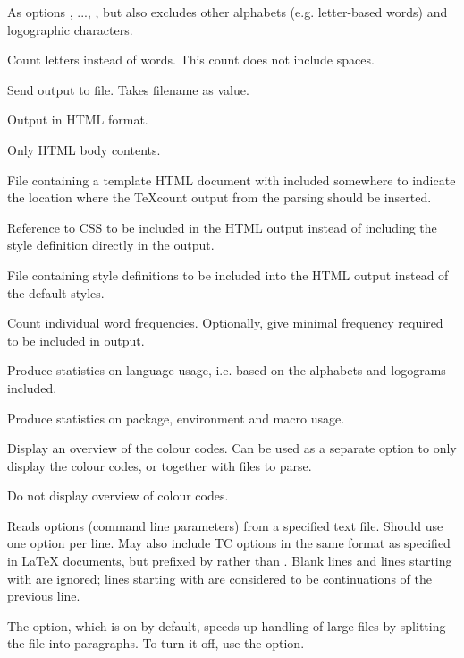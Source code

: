 \begin{description}
As options , ..., , but also excludes other alphabets (e.g. letter-based words) and logographic characters.

Count letters instead of words. This count does not include spaces.

\option[-out=]Send output to file. Takes filename as value.

\option[-html]Output in HTML format.

\option[-htmlcore]Only HTML body contents.

\option[-htmlfile=]File containing a template HTML document with  included somewhere to indicate the location where the TeXcount output from the parsing should be inserted.

\option[-css=]Reference to CSS to be included in the HTML output instead of including the style definition directly in the output.

\option[-cssfile=, -css=file:]File containing style definitions to be included into the HTML output instead of the default styles.

\option[-freq\alt{=\#}]Count individual word frequencies. Optionally, give minimal frequency required to be included in output.

\option[-stat]Produce statistics on language usage, i.e. based on the alphabets and logograms included.

Produce statistics on package, environment and macro usage.

\option[-codes]Display an overview of the colour codes. Can be used as a separate option to only display the colour codes, or together with files to parse.

\option[-nocodes]Do not display overview of colour codes.

\option[-opt=, -optionfile=]Reads options (command line parameters) from a specified text file. Should use one option per line. May also include TC options in the same format as specified in \LaTeX{} documents, but prefixed by \code{\%} rather than . Blank lines and lines starting with \code{\#} are ignored; lines starting with \code{\bs{}} are considered to be continuations of the previous line.

The  option, which is on by default, speeds up handling of large files by splitting the file into paragraphs. To turn it off, use the  option.


\end{description}
